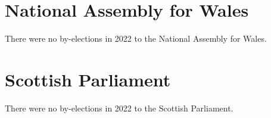 \documentclass[a4paper,openany]{book}
\begin{document}
\section{National Assembly for Wales}

There were no by-elections in 2022 to the National Assembly for Wales.


\section{Scottish Parliament}

There were no by-elections in 2022 to the Scottish Parliament.

%
%
%

%
%
\end{document}
